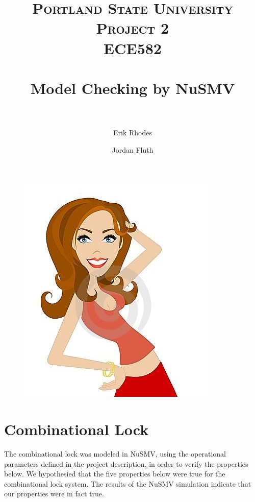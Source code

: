 \documentclass[11pt]{article}
\title{	
\normalfont \normalsize 
\textsc{\LARGE Portland State University}\\[1.5cm] %
\textsc{\Large Project 2}\\[0.5cm] %
\textsc{\large ECE582}\\[0.5cm] %
\horrule{1.2pt} \\[0.4cm] %
\huge Model Checking by NuSMV \\ %
\horrule{1.2pt} \\[0.5cm] %
}
\begin{document}
\raggedright
\author{Erik Rhodes \and Jordan Fluth} %
\maketitle %
\thispagestyle{empty}


\begin{figure}[h]\centering
\includegraphics[height=0.65\textwidth]{images/model.jpg}
		\label{LED}
	\end{figure}
	
\newpage




\section{Combinational Lock}
The combinational lock was modeled in NuSMV, using the operational parameters defined in the project description, in order to verify the properties below. We hypothesied that the five 
properties below were true for the combinational lock system. The results of the NuSMV simulation indicate that our properties were in fact true. 
	
\end{document}
